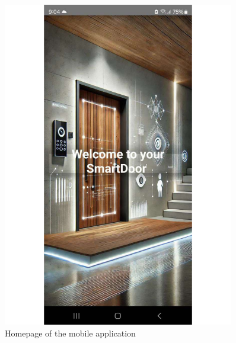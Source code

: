 \documentclass[a4paper]{scrartcl}
\begin{document}
\begin{figure}[h]
    \centering
    \begin{minipage}{0.45\textwidth}
        \centering
        \includegraphics[width=0.9\textwidth]{homepage.pdf}
        \caption{Homepage of the mobile application}
        \label{fig:homepage}
    \end{minipage}
    \hfill
    \begin{minipage}{0.45\textwidth}
        \centering

\end{minipage}
\end{figure}
\end{document}
